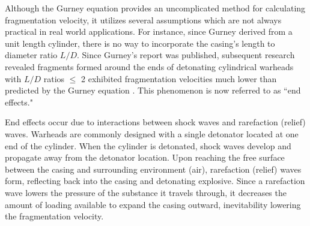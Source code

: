 Although the Gurney equation provides an uncomplicated method for calculating fragmentation velocity, it utilizes several assumptions which are not always practical in real world applications. For instance, since Gurney derived  from a unit length cylinder, there is no way to incorporate the casing's length to diameter ratio $L/D$. Since Gurney's report was published, subsequent research revealed fragments formed around the ends of detonating cylindrical warheads with $L/D$ ratios $\leq$ 2 exhibited fragmentation velocities much lower than predicted by the Gurney equation \cite{AFIT_Yves}. This phenomenon is now referred to as ``end effects."

End effects occur due to interactions between shock waves and rarefaction (relief) waves. Warheads are commonly designed with a single detonator located at one end of the cylinder. When the cylinder is detonated, shock waves develop and propagate away from the detonator location. Upon reaching the free surface between the casing and surrounding environment (air), rarefaction (relief) waves form, reflecting back into the casing and detonating explosive. Since a rarefaction wave lowers the pressure of the substance it travels through, it decreases the amount of loading available to expand the casing outward, inevitability lowering the fragmentation velocity.

